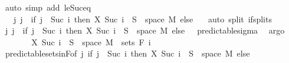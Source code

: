 \begin{isabellebody}
\ {\isacharparenleft}{\kern0pt}auto\ simp\ add{\isacharcolon}{\kern0pt}\ le{\isacharunderscore}{\kern0pt}Suc{\isacharunderscore}{\kern0pt}eq{\isacharparenright}{\kern0pt}\isanewline
\ \ \ \ \isamarkupfalse%
\ \isamarkupfalse%
\ {\isachardoublequoteopen}{\isachardot}{\kern0pt}{\isachardot}{\kern0pt}{\isachardot}{\kern0pt}\ {\isacharequal}{\kern0pt}\ {\isacharparenleft}{\kern0pt}{\isasymUnion}j{\isachardot}{\kern0pt}\ {\isacharbraceleft}{\kern0pt}j{\isacharbraceright}{\kern0pt}\ {\isasymtimes}\ {\isacharparenleft}{\kern0pt}if\ j\ {\isacharequal}{\kern0pt}\ Suc\ i\ then\ {\isacharparenleft}{\kern0pt}X\ {\isacharparenleft}{\kern0pt}Suc\ i{\isacharparenright}{\kern0pt}\ {\isacharminus}{\kern0pt}{\isacharbackquote}{\kern0pt}\ S\ {\isasyminter}\ space\ M{\isacharparenright}{\kern0pt}\ else\ {\isacharbraceleft}{\kern0pt}{\isacharbraceright}{\kern0pt}{\isacharparenright}{\kern0pt}{\isacharparenright}{\kern0pt}{\isachardoublequoteclose}\ \isamarkupfalse%
\ {\isacharparenleft}{\kern0pt}auto\ split{\isacharcolon}{\kern0pt}\ if{\isacharunderscore}{\kern0pt}splits{\isacharparenright}{\kern0pt}\isanewline
\ \ \ \ \isamarkupfalse%
\ \isamarkupfalse%
\ {\isachardoublequoteopen}{\isacharparenleft}{\kern0pt}{\isasymUnion}j{\isachardot}{\kern0pt}\ {\isacharbraceleft}{\kern0pt}j{\isacharbraceright}{\kern0pt}\ {\isasymtimes}\ {\isacharparenleft}{\kern0pt}if\ j\ {\isacharequal}{\kern0pt}\ Suc\ i\ then\ {\isacharparenleft}{\kern0pt}X\ {\isacharparenleft}{\kern0pt}Suc\ i{\isacharparenright}{\kern0pt}\ {\isacharminus}{\kern0pt}{\isacharbackquote}{\kern0pt}\ S\ {\isasyminter}\ space\ M{\isacharparenright}{\kern0pt}\ else\ {\isacharbraceleft}{\kern0pt}{\isacharbraceright}{\kern0pt}{\isacharparenright}{\kern0pt}{\isacharparenright}{\kern0pt}\ {\isasymin}\ predictable{\isacharunderscore}{\kern0pt}sigma{\isachardoublequoteclose}\ \isamarkupfalse%
\ argo\isanewline
\ \ \ \ \isamarkupfalse%
\ \isamarkupfalse%
\ {\isachardoublequoteopen}X\ {\isacharparenleft}{\kern0pt}Suc\ i{\isacharparenright}{\kern0pt}\ {\isacharminus}{\kern0pt}{\isacharbackquote}{\kern0pt}\ S\ {\isasyminter}\ space\ M\ {\isasymin}\ sets\ {\isacharparenleft}{\kern0pt}F\ i{\isacharparenright}{\kern0pt}{\isachardoublequoteclose}\ \isamarkupfalse%
\ predictable{\isacharunderscore}{\kern0pt}sets{\isacharunderscore}{\kern0pt}in{\isacharunderscore}{\kern0pt}F{\isacharbrackleft}{\kern0pt}of\ {\isachardoublequoteopen}{\isasymlambda}j{\isachardot}{\kern0pt}\ if\ j\ {\isacharequal}{\kern0pt}\ Suc\ i\ then\ {\isacharparenleft}{\kern0pt}X\ {\isacharparenleft}{\kern0pt}Suc\ i{\isacharparenright}{\kern0pt}\ {\isacharminus}{\kern0pt}{\isacharbackquote}{\kern0pt}\ S\ {\isasyminter}\ space\ M{\isacharparenright}{\kern0pt}\ else\ {\isacharbraceleft}{\kern0pt}{\isacharbraceright}{\kern0pt}{\isachardoublequoteclose}{\isacharbrackright}{\kern0pt}\ \isamarkupfalse%

\end{isabellebody}
